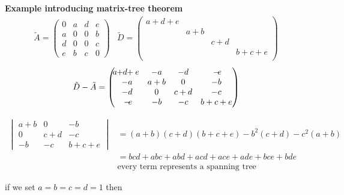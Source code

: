 \textbf{Example introducing matrix-tree theorem}\\



\begin{equation*}
\begin{array}{ll}
	\tilde A = \begin{pmatrix}
		0 & a & d & e \\
		a & 0 & 0 & b \\
		d & 0 & 0 & c \\
		e & b & c & 0 
	\end{pmatrix}
	&
	\tilde D = \begin{pmatrix}
		a+d+e \\
		& a+b \\
		& & c+d \\
		& & & b+c+e \\
	\end{pmatrix}
\end{array} 
\end{equation*}
\begin{equation*}
	\tilde D - \tilde A = \begin{pmatrix}
		\tikzmark{topA}a+\tikzmark{topA2}d+e & -a & -d & -\tikzmark{topB}e \\
		 -a & a+b & 0 & -b \\
		-d & 0 & c+d & -c \\
		-\tikzmark{botA}e & -b & -c & b+c+e \\
	\end{pmatrix}
\end{equation*}

\begin{equation*}
\begin{array}{ll}
\begin{vmatrix}
	a+b & 0 & -b \\
	0 & c+d & -c \\
	-b & -c & b+c+e
\end{vmatrix} 
& = (a+b)(c+d)(b+c+e)-b^2(c+d)-c^2(a+b) \\
& = bcd + abc+ abd +acd + ace + ade + bce + bde \\
& \text{every term represents a spanning tree}
\end{array}
\end{equation*}

if we set $a=b=c=d=1$ then

